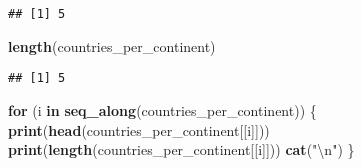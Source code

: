 \documentclass[]{article}
\newenvironment{Shaded}{\begin{snugshade}}{\end{snugshade}}
\newcommand{\CharTok}[1]{\textcolor[rgb]{0.31,0.60,0.02}{#1}}
\newcommand{\ControlFlowTok}[1]{\textcolor[rgb]{0.13,0.29,0.53}{\textbf{#1}}}
\newcommand{\KeywordTok}[1]{\textcolor[rgb]{0.13,0.29,0.53}{\textbf{#1}}}
\newcommand{\NormalTok}[1]{#1}
\newcommand{\StringTok}[1]{\textcolor[rgb]{0.31,0.60,0.02}{#1}}
\begin{document}
\begin{verbatim}
## [1] 5
\end{verbatim}

\begin{Shaded}
\begin{Highlighting}[]
\KeywordTok{length}\NormalTok{(countries_per_continent)}
\end{Highlighting}
\end{Shaded}

\begin{verbatim}
## [1] 5
\end{verbatim}

\begin{Shaded}
\begin{Highlighting}[]
\ControlFlowTok{for}\NormalTok{ (i }\ControlFlowTok{in} \KeywordTok{seq_along}\NormalTok{(countries_per_continent))}
\NormalTok{\{}
    \KeywordTok{print}\NormalTok{(}\KeywordTok{head}\NormalTok{(countries_per_continent[[i]]))}
    \KeywordTok{print}\NormalTok{(}\KeywordTok{length}\NormalTok{(countries_per_continent[[i]]))}
    \KeywordTok{cat}\NormalTok{(}\StringTok{"}\CharTok{\textbackslash{}n}\StringTok{"}\NormalTok{)}
\NormalTok{\}}
\end{Highlighting}
\end{Shaded}
\end{document}
